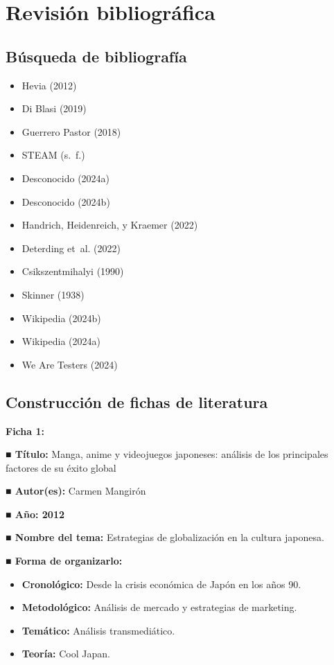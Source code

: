 \documentclass[
  letterpaper,
  DIV=11,
  numbers=noendperiod]{scrreprt}
\providecommand{\tightlist}{%
  \setlength{\itemsep}{0pt}\setlength{\parskip}{0pt}}\usepackage{longtable,booktabs,array}
\begin{document}
\section{Revisión bibliográfica}\label{revisiuxf3n-bibliogruxe1fica}

\subsection{Búsqueda de
bibliografía}\label{buxfasqueda-de-bibliografuxeda}

\begin{itemize}
\tightlist
\item
  Hevia (2012)
\item
  Di Blasi (2019)
\item
  Guerrero Pastor (2018)
\item
  STEAM (s.~f.)
\item
  Desconocido (2024a)
\item
  Desconocido (2024b)
\item
  Handrich, Heidenreich, y Kraemer (2022)
\item
  Deterding et~al. (2022)
\item
  Csikszentmihalyi (1990)
\item
  Skinner (1938)
\item
  Wikipedia (2024b)
\item
  Wikipedia (2024a)
\item
  We Are Testers (2024)
\end{itemize}

\subsection{Construcción de fichas de
literatura}\label{construcciuxf3n-de-fichas-de-literatura}

\textbf{Ficha 1:}

\textbf{■ Título:} Manga, anime y videojuegos japoneses: análisis de los
principales factores de su éxito global

\textbf{■ Autor(es):} Carmen Mangirón

\textbf{■ Año: 2012}

\textbf{■ Nombre del tema:} Estrategias de globalización en la cultura
japonesa.

\textbf{■ Forma de organizarlo:}

\begin{itemize}
\item
  \textbf{Cronológico:} Desde la crisis económica de Japón en los años
  90.
\item
  \textbf{Metodológico:} Análisis de mercado y estrategias de marketing.
\item
  \textbf{Temático:} Análisis transmediático.
\item
  \textbf{Teoría:} Cool Japan.
\end{itemize}
\end{document}
